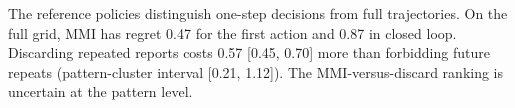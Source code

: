 \begin{table}[!htbp]
\centering
\caption{Benchmark reference policies: mean regret [95\% task-bootstrap CI]. The 140 tasks are stratified by the exact best action and are \emph{not} a population sample; the grid supplies the reference distribution. Pattern-cluster intervals are wider (see \texttt{reference\_policies.json}).}
\label{tab:bench-ref}
\scriptsize
\setlength{\tabcolsep}{3pt}
\resizebox{\linewidth}{!}{}
\end{table}

The reference policies distinguish one-step decisions from full trajectories. On the full grid, MMI has regret 0.47 for the first action and 0.87 in closed loop. Discarding repeated reports costs 0.57 [0.45, 0.70] more than forbidding future repeats (pattern-cluster interval [0.21, 1.12]). The MMI-versus-discard ranking is uncertain at the pattern level.
